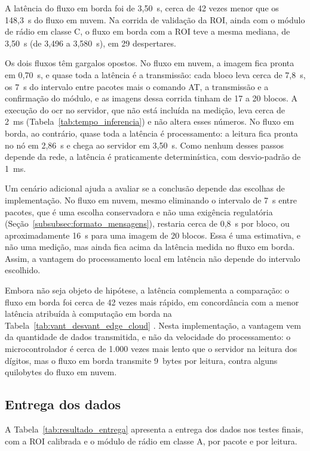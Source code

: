 A latência do fluxo em borda foi de 3,50~s, cerca de 42 vezes menor que os 148,3~s do fluxo
em nuvem. Na corrida de validação da ROI, ainda com o módulo de rádio em classe C, o fluxo em
borda com a ROI teve a mesma mediana, de 3,50~s (de 3,496 a 3,580~s), em 29 despertares.

Os dois fluxos têm gargalos opostos. No fluxo em nuvem, a imagem fica pronta em 0,70~s, e
quase toda a latência é a transmissão: cada bloco leva cerca de 7,8~s, os 7~s do intervalo
entre pacotes mais o comando AT, a transmissão e a confirmação do módulo, e as imagens
dessa corrida tinham de 17 a 20 blocos. A execução do \gls{ocr} no servidor, que não está
incluída na medição, leva cerca de 2~ms (Tabela~\ref{tab:tempo_inferencia}) e não altera
esses números. No fluxo em borda, ao contrário, quase toda a latência é processamento: a
leitura fica pronta no nó em 2,86~s e chega ao servidor em 3,50~s. Como nenhum desses
passos depende da rede, a latência é praticamente determinística, com desvio-padrão de 1~ms.

Um cenário adicional ajuda a avaliar se a conclusão depende das escolhas de implementação.
No fluxo em nuvem, mesmo eliminando o intervalo de 7~s entre pacotes, que é uma escolha
conservadora e não uma exigência regulatória (Seção~\ref{subsubsec:formato_mensagens}),
restaria cerca de 0,8~s por bloco, ou aproximadamente 16~s para uma imagem de 20 blocos.
Essa é uma estimativa, e não uma medição, mas ainda fica acima da latência medida no
fluxo em borda. Assim, a vantagem do processamento local em latência não depende do
intervalo escolhido.

Embora não seja objeto de hipótese, a latência complementa a comparação: o fluxo em borda
foi cerca de 42 vezes mais rápido, em concordância com a menor
latência atribuída à computação em borda na
Tabela~\ref{tab:vant_desvant_edge_cloud} \cite{andriulo2024edge}. Nesta implementação, a
vantagem vem da quantidade de dados transmitida, e não da velocidade do processamento: o
microcontrolador é cerca de 1.000 vezes mais lento que o servidor na leitura dos dígitos,
mas o fluxo em borda transmite 9~bytes por leitura, contra alguns quilobytes do fluxo em
nuvem.

\subsection{Entrega dos dados}
\label{subsec:resultado_entrega}

A Tabela~\ref{tab:resultado_entrega} apresenta a entrega dos dados nos testes finais,
com a ROI calibrada e o módulo de rádio em classe A, por pacote e por leitura.

